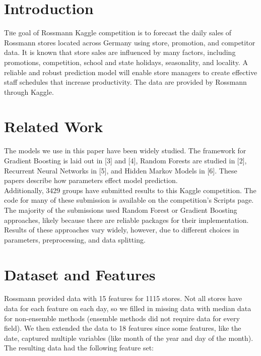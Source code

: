 \documentclass[twoside]{article}
\begin{document}
\begin{multicols}{2} %

\section{Introduction}

\lettrine[nindent=0em,lines=3]{T} he goal of Rossmann Kaggle competition is to forecast the daily sales of Rossmann stores located across Germany using store, promotion, and competitor data. It is known that store sales are influenced by many factors, including promotions, competition, school and state holidays, seasonality, and locality. A reliable and robust prediction model will enable store managers to create effective staff schedules that increase productivity. The data are provided by Rossmann through Kaggle.


\section{Related Work}
\indent \indent The models we use in this paper have been widely studied. The framework for Gradient Boosting is laid out in [3] and [4], Random Forests are studied in [2], Recurrent Neural Networks in [5], and Hidden Markov Models in [6]. These papers describe how parameters effect model prediction. \\
\indent  Additionally, 3429 groups have submitted results to this Kaggle competition. The code for many of these submission is available on the competition's Scripts page. The majority of the submissions used Random Forest or Gradient Boosting approaches, likely because there are reliable packages for their implementation. Results of these approaches vary widely, however, due to different choices in parameters, preprocessing, and data splitting.




\section{Dataset and Features}


\indent \indent Rossmann provided data with 15 features for 1115 stores. Not all stores have data for each feature on each day, so we filled in missing data with median data for non-ensemble methods (ensemble methods did not require data for every field). We then extended the data to 18 features since some features, like the date, captured multiple variables (like month of the year and day of the month). The resulting data had the following feature set: \\


\end{multicols}
\end{document}
